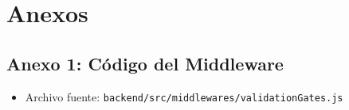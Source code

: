 \documentclass[12pt,a4paper]{article}
\begin{document}
\vspace{0.4cm}

\section{Anexos}
\subsection*{Anexo 1: Código del Middleware}
\begin{itemize}[leftmargin=1.5em, itemsep=1.5pt]
    \item Archivo fuente: \texttt{backend/src/middlewares/validationGates.js}
\end{itemize}
\end{document}
